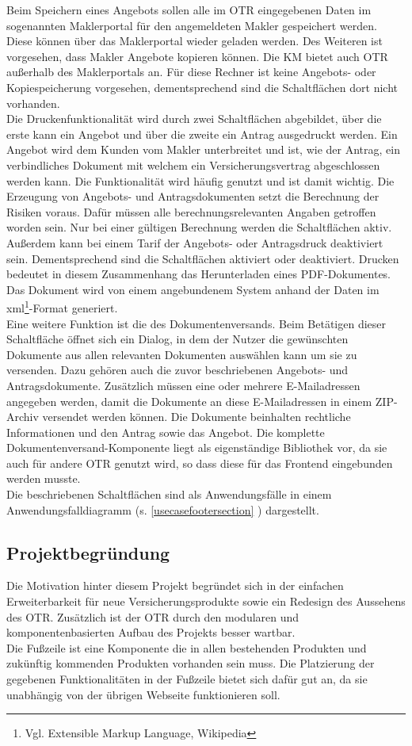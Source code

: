 Beim Speichern eines Angebots sollen alle im \ac{OTR} eingegebenen Daten im sogenannten Maklerportal für den angemeldeten Makler gespeichert werden. Diese können über das Maklerportal wieder geladen werden. Des Weiteren ist vorgesehen, dass Makler Angebote kopieren können.
Die \ac{KM} bietet auch \ac{OTR} außerhalb des Maklerportals an. Für diese Rechner ist keine Angebots- oder Kopiespeicherung vorgesehen, dementsprechend sind die Schaltflächen dort nicht vorhanden. \\
Die Druckenfunktionalität wird durch zwei Schaltflächen abgebildet, über die erste kann ein Angebot und über die zweite ein Antrag ausgedruckt werden. Ein Angebot wird dem Kunden vom Makler unterbreitet und ist, wie der Antrag, ein verbindliches Dokument mit welchem ein Versicherungsvertrag abgeschlossen werden kann. Die Funktionalität wird häufig genutzt und ist damit wichtig. Die Erzeugung von Angebots- und Antragsdokumenten setzt die Berechnung der Risiken voraus. Dafür müssen alle berechnungsrelevanten Angaben getroffen worden sein. Nur bei einer gültigen Berechnung werden die Schaltflächen aktiv. Außerdem kann bei einem Tarif der Angebots- oder Antragsdruck deaktiviert sein. Dementsprechend sind die Schaltflächen aktiviert oder deaktiviert. Drucken bedeutet in diesem Zusammenhang das Herunterladen eines PDF-Dokumentes. Das Dokument wird von einem angebundenem System anhand der Daten im \gls{xml}\footnote{Vgl.\cite{XML2022} Extensible Markup Language, Wikipedia}-Format generiert.\\
Eine weitere Funktion ist die des Dokumentenversands. Beim Betätigen dieser Schaltfläche öffnet sich ein Dialog, in dem der Nutzer die gewünschten Dokumente aus allen relevanten Dokumenten auswählen kann um sie zu versenden. Dazu gehören auch die zuvor beschriebenen Angebots- und Antragsdokumente. Zusätzlich müssen eine oder mehrere E-Mailadressen angegeben werden, damit die Dokumente an diese E-Mailadressen in einem ZIP-Archiv versendet werden können. Die Dokumente beinhalten rechtliche Informationen und den Antrag sowie das Angebot. Die komplette Dokumentenversand-Komponente liegt als eigenständige Bibliothek vor, da sie auch für andere \ac{OTR} genutzt wird, so dass diese für das Frontend eingebunden werden musste.\\
Die beschriebenen Schaltflächen sind als Anwendungsfälle in einem Anwendungsfalldiagramm (s. \ref{usecasefootersection} ) dargestellt.

\subsection{Projektbegründung}
\label{projektbegründung}
Die Motivation hinter diesem Projekt begründet sich in der einfachen Erweiterbarkeit für neue Versicherungsprodukte sowie ein Redesign des Aussehens des \ac{OTR}. Zusätzlich ist der \ac{OTR} durch den modularen und komponentenbasierten Aufbau des Projekts besser wartbar. \\
Die Fußzeile ist eine Komponente die in allen bestehenden Produkten und zukünftig kommenden Produkten vorhanden sein muss. Die Platzierung der gegebenen Funktionalitäten in der Fußzeile bietet sich dafür gut an, da sie unabhängig von der übrigen Webseite funktionieren soll.
